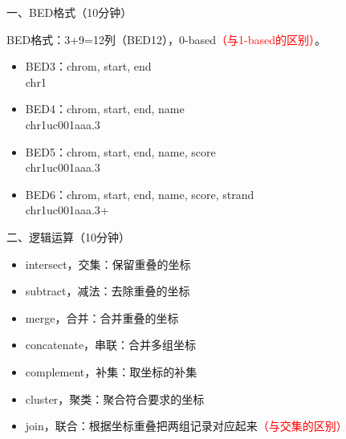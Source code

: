 \documentclass{TIJMUjiaoanSY}
\begin{document}

\firstTail


\newpage
\otherHeader

\noindent
一、BED格式（10分钟）

BED格式：3+9=12列（BED12），0-based\textcolor{red}{（与1-based的区别）}。
\begin{itemize}
  \item BED3：chrom, start, end\\ \hspace*{1.35cm} chr1
  \item BED4：chrom, start, end, name\\ \hspace*{1.35cm} chr1\quad uc001aaa.3
  \item BED5：chrom, start, end, name, score\\ \hspace*{1.35cm} chr1\quad uc001aaa.3
  \item BED6：chrom, start, end, name, score, strand\\ \hspace*{1.35cm} chr1\quad uc001aaa.3\quad +
\end{itemize}

\vspace*{0.2cm}
\noindent
二、逻辑运算（10分钟）
\begin{itemize}
  \item intersect，交集：保留重叠的坐标
  \item subtract，减法：去除重叠的坐标
  \item merge，合并：合并重叠的坐标
  \item concatenate，串联：合并多组坐标
  \item complement，补集：取坐标的补集
  \item cluster，聚类：聚合符合要求的坐标
  \item join，联合：根据坐标重叠把两组记录对应起来\textcolor{red}{（与交集的区别）}
\end{itemize}
\end{document}
